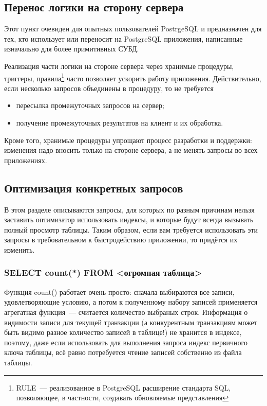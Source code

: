 \subsection{Перенос логики на сторону сервера}
Этот пункт очевиден для опытных пользователей PostrgeSQL и предназначен для тех, кто использует или переносит на 
PostgreSQL приложения, написанные изначально для более примитивных СУБД.

Реализация части логики на стороне сервера через хранимые процедуры, триггеры, правила\footnote{RULE~--- реализованное в 
PostgreSQL расширение стандарта SQL, позволяющее, в частности, создавать обновляемые представления} часто позволяет ускорить 
работу приложения. Действительно, если несколько запросов объединены в процедуру, то не требуется
\begin{itemize}
\item пересылка промежуточных запросов на сервер;
\item получение промежуточных результатов на клиент и их обработка.
\end{itemize}

Кроме того, хранимые процедуры упрощают процесс разработки и поддержки: изменения надо вносить только на стороне сервера, 
а не менять запросы во всех приложениях.

\subsection{Оптимизация конкретных запросов}
В этом разделе описываются запросы, для которых по разным причинам нельзя заставить оптимизатор использовать индексы, и 
которые будут всегда вызывать полный просмотр таблицы. Таким образом, если вам требуется использовать эти запросы в 
требовательном к быстродействию приложении, то придётся их изменить.

\subsubsection{SELECT count(*) FROM <огромная таблица>}
Функция count() работает очень просто: сначала выбираются все записи, удовлетворяющие условию, а потом к полученному набору 
записей применяется агрегатная функция~--- считается количество выбраных строк. 
Информация о видимости записи для текущей транзакции (а конкурентным транзакциям может быть видимо разное
количество записей в таблице!) не хранится в индексе, поэтому, даже если использовать для выполнения 
запроса индекс первичного ключа таблицы, всё равно потребуется чтение записей собственно из файла таблицы.

